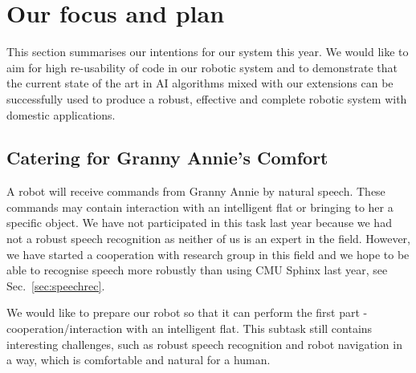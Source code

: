  
\section{Our focus and plan}

This section summarises our intentions for our system this year. We would like to aim for high re-usability of code in our robotic system and to demonstrate that the current state of the art in AI algorithms mixed with our extensions can be successfully used to produce a robust, effective and complete robotic system with domestic applications.  

\subsection{Catering for Granny Annie’s Comfort}

A robot will receive commands from Granny Annie by natural speech. These commands may contain interaction with an intelligent flat or bringing to her a specific object. 
We have not participated in this task last year because we had not a robust speech recognition as neither of us is an expert in the field. 
However, we have started a cooperation with research group in this field and we hope to be able to recognise speech more robustly than using CMU Sphinx last year, see Sec.~\ref{sec:speechrec}.

We would like to prepare our robot so that it can perform the first part - cooperation/interaction with an intelligent flat. This subtask still contains interesting challenges, such as robust speech recognition and robot navigation in a way, which is comfortable and natural for a human.  




